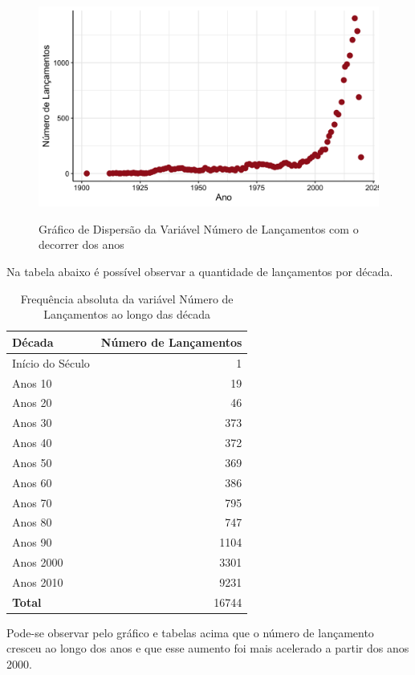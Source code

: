 \documentclass[a4paper, 12pt]{article} %
\begin{document}
\begin{figure}[H]
    \centering
    \caption{Gráfico de Dispersão da Variável Número de Lançamentos com o decorrer dos anos}
    \includegraphics[scale=0.15]{Fig_Lancamentos_Ano.png}
    \label{fig:my_label}
\end{figure}

Na tabela abaixo é possível observar a quantidade de lançamentos por década. 

\begin{table}[H]
\caption{Frequência absoluta da variável Número de Lançamentos ao longo das década}
\centering
\begin{tabular}{l|r}
\hline
\multicolumn{1}{l|}{\textbf{Década}} &
\multicolumn{1}{r}{\textbf{Número de Lançamentos}}\\
\hline
Início do Século & 1\\
Anos 10 & 19\\
Anos 20 & 46\\
Anos 30 & 373\\
Anos 40 & 372\\
Anos 50 & 369\\
Anos 60 & 386\\
Anos 70 & 795\\
Anos 80 & 747\\
Anos 90 & 1104\\
Anos 2000 & 3301\\
Anos 2010 & 9231\\
\hline
\textbf{Total} & {16744}\\
\hline
\end{tabular}
\end{table}

Pode-se observar pelo gráfico e tabelas acima que o número de lançamento cresceu ao longo dos anos e que esse aumento foi mais acelerado a partir dos anos 2000.\\
\end{document}
